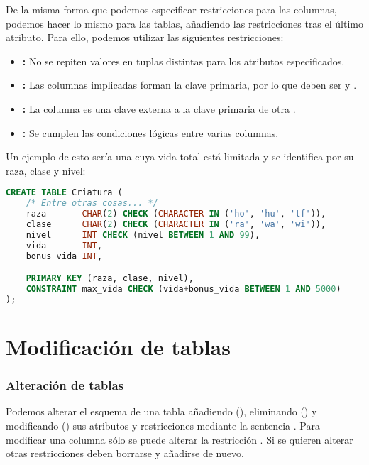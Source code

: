 De la misma forma que podemos especificar restricciones para las columnas, podemos hacer lo mismo para las tablas, añadiendo las restricciones tras el último atributo.
Para ello, podemos utilizar las siguientes restricciones:

\begin{itemize}
	\item{}\textbf{:} No se repiten valores en tuplas distintas para los atributos especificados.
	\item{}\textbf{:} Las columnas implicadas forman la clave primaria, por lo que deben ser  y .
	\item{}\textbf{:} La columna  es una clave externa a la clave primaria  de otra .
	\item{}\textbf{:} Se cumplen las condiciones lógicas entre varias columnas.
\end{itemize}

Un ejemplo de esto sería una  cuya vida total está limitada y se identifica por su raza, clase y nivel:

\begin{lstlisting}[language=SQL]
CREATE TABLE Criatura (
	/* Entre otras cosas... */
	raza       CHAR(2) CHECK (CHARACTER IN ('ho', 'hu', 'tf')),
	clase      CHAR(2) CHECK (CHARACTER IN ('ra', 'wa', 'wi')),
	nivel      INT CHECK (nivel BETWEEN 1 AND 99),
	vida       INT,
	bonus_vida INT,

	PRIMARY KEY (raza, clase, nivel),
	CONSTRAINT max_vida CHECK (vida+bonus_vida BETWEEN 1 AND 5000)
);
\end{lstlisting}

\section{Modificación de tablas}

\subsubsection{Alteración de tablas}

Podemos alterar el esquema de una tabla añadiendo (), eliminando () y modificando () sus atributos y restricciones mediante la sentencia .
Para modificar una columna sólo se puede alterar la restricción .
Si se quieren alterar otras restricciones deben borrarse y añadirse de nuevo.

